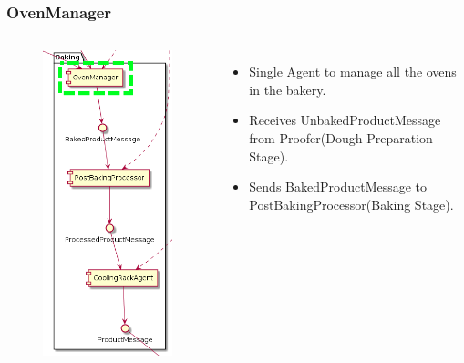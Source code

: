 \documentclass{beamer}
\begin{document}
\begin{frame}
    \frametitle{\huge{OvenManager}}
    \begin{columns}[t]
        \begin{figure}[H]
            \centering
            \includegraphics[width=0.6\linewidth]{baking_OvenManager.png}
        \end{figure}
            \begin{itemize}
                \item Single Agent to manage all the ovens in the bakery.
                \item Receives UnbakedProductMessage
from Proofer(Dough Preparation Stage).
                \item Sends BakedProductMessage
to PostBakingProcessor(Baking Stage).
            \end{itemize}
    \end{columns}
\end{frame}
\end{document}

